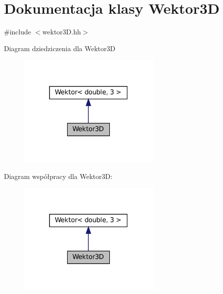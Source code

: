 \hypertarget{class_wektor3_d}{}\section{Dokumentacja klasy Wektor3D}
\label{class_wektor3_d}


{\ttfamily \#include $<$wektor3\+D.\+hh$>$}



Diagram dziedziczenia dla Wektor3D\nopagebreak
\begin{figure}[H]
\begin{center}
\leavevmode
\includegraphics[width=199pt]{class_wektor3_d__inherit__graph}
\end{center}
\end{figure}


Diagram współpracy dla Wektor3D\+:\nopagebreak
\begin{figure}[H]
\begin{center}
\leavevmode
\includegraphics[width=199pt]{class_wektor3_d__coll__graph}
\end{center}
\end{figure}
